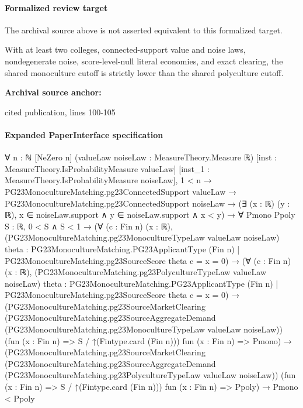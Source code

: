 \documentclass[10pt]{article}
\begin{document}
\paragraph{Formalized review target}
The archival source above is not asserted equivalent to this formalized target.
\begin{ReviewVerbatim}
With at least two colleges, connected-support value and noise laws, nondegenerate noise, score-level-null literal economies, and exact clearing, the shared monoculture cutoff is strictly lower than the shared polyculture cutoff.
\end{ReviewVerbatim}

\textbf{Archival source anchor:} {\footnotesize\raggedright cited publication, lines 100-\allowbreak{}105\par}
\paragraph{Expanded PaperInterface specification}
\begin{ReviewVerbatim}
∀ {n : ℕ} [NeZero n] (valueLaw noiseLaw : MeasureTheory.Measure ℝ) [inst : MeasureTheory.IsProbabilityMeasure valueLaw]
  [inst_1 : MeasureTheory.IsProbabilityMeasure noiseLaw],
  1 < n →
    PG23MonocultureMatching.pg23ConnectedSupport valueLaw →
      PG23MonocultureMatching.pg23ConnectedSupport noiseLaw →
        (∃ (x : ℝ) (y : ℝ), x ∈ noiseLaw.support ∧ y ∈ noiseLaw.support ∧ x < y) →
          ∀ {Pmono Ppoly S : ℝ},
            0 < S ∧ S < 1 →
              (∀ (c : Fin n) (x : ℝ),
                  (PG23MonocultureMatching.pg23MonocultureTypeLaw valueLaw noiseLaw)
                      {theta : PG23MonocultureMatching.PG23ApplicantType (Fin n) |
                        PG23MonocultureMatching.pg23SourceScore theta c = x} =
                    0) →
                (∀ (c : Fin n) (x : ℝ),
                    (PG23MonocultureMatching.pg23PolycultureTypeLaw valueLaw noiseLaw)
                        {theta : PG23MonocultureMatching.PG23ApplicantType (Fin n) |
                          PG23MonocultureMatching.pg23SourceScore theta c = x} =
                      0) →
                  (PG23MonocultureMatching.pg23SourceMarketClearing
                      (PG23MonocultureMatching.pg23SourceAggregateDemand
                        (PG23MonocultureMatching.pg23MonocultureTypeLaw valueLaw noiseLaw))
                      (fun (x : Fin n) => S / ↑(Fintype.card (Fin n))) fun (x : Fin n) => Pmono) →
                    (PG23MonocultureMatching.pg23SourceMarketClearing
                        (PG23MonocultureMatching.pg23SourceAggregateDemand
                          (PG23MonocultureMatching.pg23PolycultureTypeLaw valueLaw noiseLaw))
                        (fun (x : Fin n) => S / ↑(Fintype.card (Fin n))) fun (x : Fin n) => Ppoly) →
                      Pmono < Ppoly
\end{ReviewVerbatim}
\end{document}
